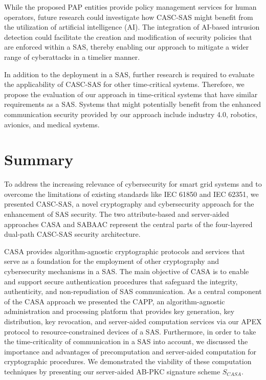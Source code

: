 While the proposed PAP entities provide policy management services for human operators, future research could investigate how CASC-SAS might benefit from the utilization of artificial intelligence (AI).
The integration of AI-based intrusion detection could facilitate the creation and modification of security policies that are enforced within a SAS, thereby enabling our approach to mitigate a wider range of cyberattacks in a timelier manner.

In addition to the deployment in a SAS, further research is required to evaluate the applicability of CASC-SAS for other time-critical systems.
Therefore, we propose the evaluation of our approach in time-critical systems that have similar requirements as a SAS.
Systems that might potentially benefit from the enhanced communication security provided by our approach include industry 4.0, robotics, avionics, and medical systems.

\section{Summary}
\label{sec:conclusion:summary}
To address the increasing relevance of cybersecurity for smart grid systems and to overcome the limitations of existing standards like IEC 61850 and IEC 62351, we presented CASC-SAS, a novel cryptography and cybersecurity approach for the enhancement of SAS security.
The two attribute-based and server-aided approaches CASA and SABAAC represent the central parts of the four-layered dual-path CASC-SAS security architecture.

CASA provides algorithm-agnostic cryptographic protocols and services that serve as a foundation for the employment of other cryptography and cybersecurity mechanisms in a SAS.
The main objective of CASA is to enable and support secure authentication procedures that safeguard the integrity, authenticity, and non-repudiation of SAS communication.
As a central component of the CASA approach we presented the CAPP, an algorithm-agnostic administration and processing platform that provides key generation, key distribution, key revocation, and server-aided computation services via our APEX protocol to resource-constrained devices of a SAS.
Furthermore, in order to take the time-criticality of communication in a SAS into account, we discussed the importance and advantages of precomputation and server-aided computation for cryptographic procedures.
We demonstrated the viability of these computation techniques by presenting our server-aided AB-PKC signature scheme $S_{CASA}$.

